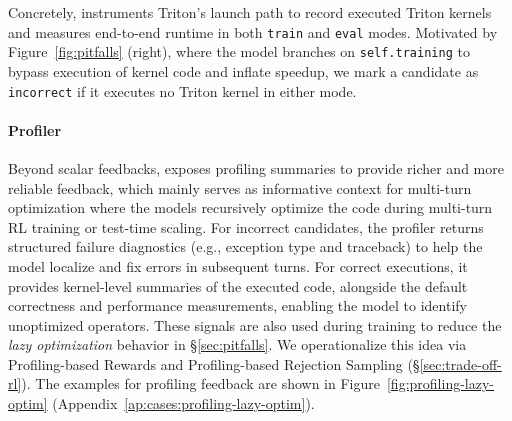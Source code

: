 Concretely, \env{} instruments Triton's launch path to record executed Triton kernels and measures end-to-end runtime in both \texttt{train} and \texttt{eval} modes. Motivated by Figure~\ref{fig:pitfalls} (right), where the model branches on \texttt{self.training} to bypass execution of kernel code and inflate speedup, we mark a candidate as \texttt{incorrect} if it executes no Triton kernel in either mode.

\paragraph{Profiler}
 Beyond scalar feedbacks, \env{} exposes profiling summaries to provide richer and more reliable feedback, which mainly serves as informative context for multi-turn optimization where the models recursively optimize the code during multi-turn RL training or test-time scaling. For incorrect candidates, the profiler returns structured failure diagnostics (e.g., exception type and traceback) to help the model localize and fix errors in subsequent turns. For correct executions, it provides kernel-level summaries of the executed code, alongside the default correctness and performance measurements, enabling the model to identify unoptimized operators.
These signals are also used during training to reduce the \emph{lazy optimization} behavior in \S\ref{sec:pitfalls}. We operationalize this idea via Profiling-based Rewards and Profiling-based Rejection Sampling (\S\ref{sec:trade-off-rl}). The examples for profiling feedback are shown in Figure~\ref{fig:profiling-lazy-optim} (Appendix~\ref{ap:cases:profiling-lazy-optim}).